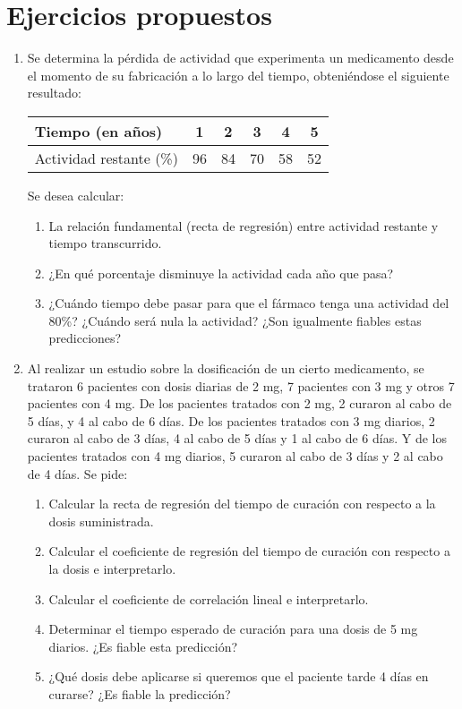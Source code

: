 \section{Ejercicios propuestos}
\begin{enumerate}[leftmargin=*]
\item  Se determina la pérdida de actividad que experimenta un medicamento desde el momento de su fabricación a lo
largo del tiempo, obteniéndose el siguiente resultado:
\begin{center}
\begin{tabular}{|l|c|c|c|c|c|}
\hline 
Tiempo (en años) & 1 & 2 & 3 & 4 & 5 \\ 
\hline 
Actividad restante (\%) & 96 & 84 & 70 & 58 & 52 \\ 
\hline
\end{tabular}
\end{center}
Se desea calcular:
\begin{enumerate}
\item  La relación fundamental (recta de regresión) entre actividad restante y tiempo transcurrido.
\item ¿En qué porcentaje disminuye la actividad cada año que pasa?
\item ¿Cuándo tiempo debe pasar para que el fármaco tenga una actividad del 80\%? ¿Cuándo será nula la actividad?
¿Son igualmente fiables estas predicciones?
\end{enumerate}

\item Al realizar un estudio sobre la dosificación de un cierto medicamento, se trataron 6 pacientes con dosis diarias
de 2 mg, 7 pacientes con 3 mg y otros 7 pacientes con 4 mg. De los pacientes tratados con 2 mg, 2 curaron al cabo de 5
días, y 4 al cabo de 6 días. De los pacientes tratados con 3 mg diarios, 2 curaron al cabo de 3 días, 4 al cabo de 5
días y 1 al cabo de 6 días. Y de los pacientes tratados con 4 mg diarios, 5 curaron al cabo de 3 días y 2 al cabo de 4
días. Se pide: 
\begin{enumerate}
\item Calcular la recta de regresión del tiempo de curación con respecto a la dosis suministrada.
\item Calcular el coeficiente de regresión del tiempo de curación con respecto a la dosis e interpretarlo.
\item Calcular el coeficiente de correlación lineal e interpretarlo.
\item Determinar el tiempo esperado de curación para una dosis de 5 mg diarios. ¿Es fiable esta predicción?
\item ¿Qué dosis debe aplicarse si queremos que el paciente tarde 4 días en curarse? ¿Es fiable la predicción?
\end{enumerate}


\end{enumerate}
